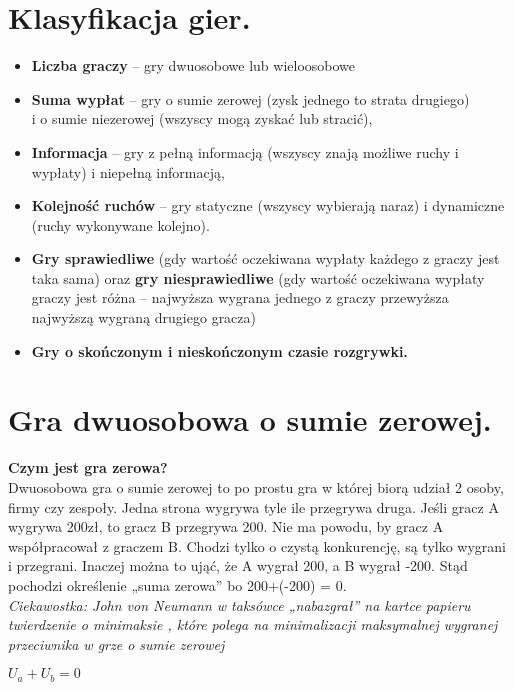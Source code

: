 \documentclass[12pt]{article}
\begin{document}
\section{Klasyfikacja gier.}
\begin{itemize}
\item \textbf{Liczba graczy} – gry dwuosobowe lub wieloosobowe
\item \textbf{Suma wypłat} – gry o sumie zerowej (zysk jednego to strata drugiego) \\ i o sumie niezerowej (wszyscy mogą zyskać lub stracić),
\item \textbf{Informacja} – gry z pełną informacją (wszyscy znają możliwe ruchy i wypłaty) i niepełną informacją,
\item \textbf{Kolejność ruchów} – gry statyczne (wszyscy wybierają naraz) i dynamiczne (ruchy wykonywane kolejno).
\item \textbf{Gry sprawiedliwe} (gdy wartość oczekiwana wypłaty każdego z graczy jest taka sama) oraz \textbf{gry niesprawiedliwe} (gdy wartość oczekiwana wypłaty graczy jest różna – najwyższa wygrana jednego z graczy przewyższa najwyższą wygraną drugiego gracza) 
\item \textbf{Gry o skończonym i nieskończonym czasie rozgrywki.}
\end{itemize}

\section{Gra dwuosobowa o sumie zerowej.}
\textbf{Czym jest gra zerowa?}
\\
Dwuosobowa gra o sumie zerowej to po prostu gra w której biorą udział 2 osoby, firmy czy zespoły. Jedna strona wygrywa tyle ile przegrywa druga. Jeśli gracz A wygrywa 200zł, to gracz B przegrywa 200. Nie ma powodu, by gracz A współpracował z graczem B. Chodzi tylko o czystą konkurencję, są tylko wygrani \\ i przegrani. Inaczej można to ująć, że A wygrał 200, a B wygrał -200. Stąd pochodzi określenie „suma zerowa” bo 200+(-200) = 0.
\\
\emph{Ciekawostka: John von Neumann w taksówce „nabazgrał” na kartce papieru twierdzenie o minimaksie , które polega na minimalizacji maksymalnej wygranej przeciwnika w grze o sumie zerowej}
\\
\begin{center} $U_{a} + U_{b} = 0$ \end{center}
\end{document}
